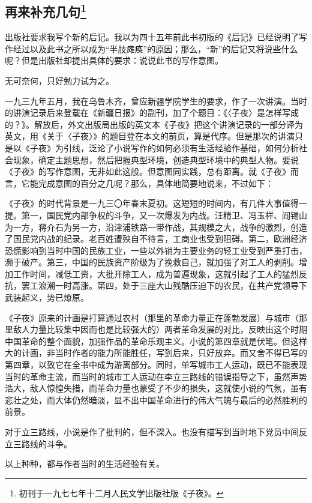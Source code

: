 \subsection*{再来补充几句\footnote{初刊于一九七七年十二月人民文学出版社版《子夜》。}}
\par 出版社要求我写个新的后记。我以为四十五年前此书初版的《后记》已经说明了写作经过以及此书之所以成为“半肢瘫痪”的原因；那么，“新”的后记又将说些什么呢？但是出版社却提出具体的要求：说说此书的写作意图。
\par 无可奈何，只好勉力试为之。
\par 一九三九年五月，我在乌鲁木齐，曾应新疆学院学生的要求，作了一次讲演。当时的讲演记录后来登载在《新疆日报》的副刊，加了个题目：《〈子夜〉是怎样写成的？》。解放后，外文出版局出版的英文本《子夜》把这个讲演记录的一部分译为英文，用《关于〈子夜〉》的题目登在本文的前页，算是代序。但是那次的讲演只是以《子夜》为引线，泛论了小说写作的如何必须有生活经验作基础，如何分析社会现象，确定主题思想，然后把握典型环境，创造典型环境中的典型人物。要说《子夜》的写作意图，无非如此这般。但意图同实践，总有距离。就《子夜》而言，它能完成意图的百分之几呢？那么，具体地简要地说来，不过如下：
\par 《子夜》的时代背景是一九三〇年春末夏初。这短短的时间内，有几件大事值得一提。第一，国民党内部争权的斗争，又一次爆发为内战。汪精卫、冯玉祥、阎锡山为一方，蒋介石为另一方，沿津浦铁路一带作战，其规模之大，战争的激烈，创造了国民党内战的纪录。老百姓遭殃自不待言，工商业也受到阻碍。第二，欧洲经济恐慌影响到当时中国的民族工业，一些以外销为主要业务的轻工业受到严重打击，濒于破产。第三，中国的民族资产阶级为了挽救自己，就加强了对工人的剥削。增加工作时间，减低工资，大批开除工人，成为普遍现象，这就引起了工人的猛烈反抗，罢工浪潮一时高涨。第四，处于三座大山残酷压迫下的农民，在共产党领导下武装起义，势已燎原。
\par 《子夜》原来的计画是打算通过农村（那里的革命力量正在蓬勃发展）与城市（那里敌人力量比较集中因而也是比较强大的）两者革命发展的对比，反映出这个时期中国革命的整个面貌，加强作品的革命乐观主义。小说的第四章就是伏笔。但这样大的计画，非当时作者的能力所能胜任，写到后来，只好放弃。而又舍不得已写的第四章，以致它在全书中成为游离部分。同时，单写城市工人运动，既已不能表现当时的革命主流，而当时的城市工人运动在李立三路线的错误指导之下，虽然声势浩大，敌人惊惶失措，而革命力量也蒙受了不少的损失，这就使小说的气氛，虽有悲壮之处，而大体仍然暗淡，显不出中国革命进行的伟大气魄与最后的必然胜利的前景。
\par 对于立三路线，小说是作了批判的，但不深入。也没有描写到当时地下党员中间反立三路线的斗争。
\par 以上种种，都与作者当时的生活经验有关。

